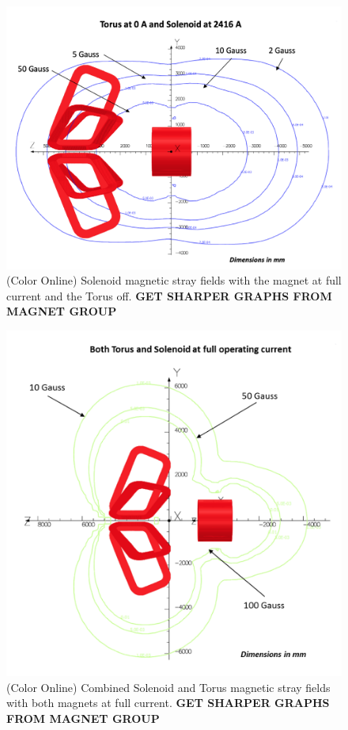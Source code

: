 \documentclass[final,3p,twocolumn]{elsarticle}
\begin{document}
\begin{figure}[htbp!]
\centerline{\includegraphics[width=1.0\columnwidth]{mag-field-1.png}}
\caption{(Color Online) Solenoid magnetic stray fields with the magnet at full current and the Torus off. {\bf GET SHARPER GRAPHS
FROM MAGNET GROUP}}
\label{stray-field1}
\end{figure}

\begin{figure}[htbp!]
\centerline{\includegraphics[width=1.2\columnwidth]{mag-field-2.png}}
\caption{(Color Online) Combined Solenoid and Torus magnetic stray fields with both magnets at full current.  {\bf GET SHARPER
GRAPHS FROM MAGNET GROUP}}
\label{stray-field2}
\end{figure}
\end{document}
